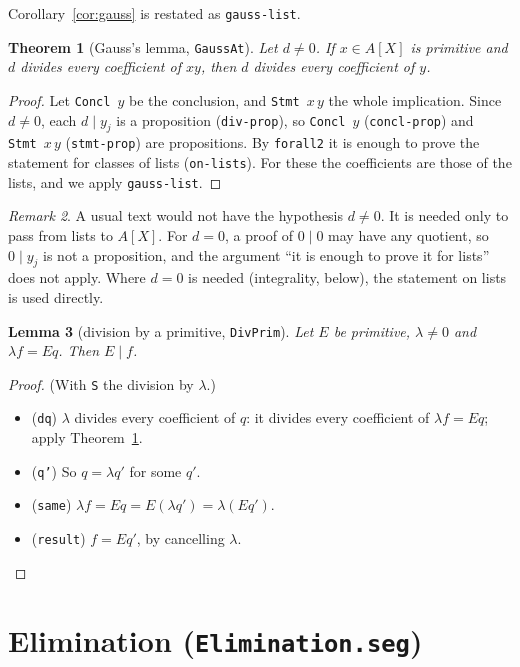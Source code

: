 \documentclass[11pt]{amsart}
\newtheorem{theorem}{Theorem}[section]
\newtheorem{lemma}[theorem]{Lemma}
\theoremstyle{definition}
\theoremstyle{remark}
\newtheorem{remark}[theorem]{Remark}
\newcommand{\nm}[1]{\textup{\texttt{#1}}}
\newcommand{\file}[1]{\textup{\texttt{#1.seg}}}
\begin{document}
Corollary~\ref{cor:gauss} is restated as \nm{gauss-list}.

\begin{theorem}[Gauss's lemma, \nm{GaussAt}]\label{thm:gauss}
Let $d\neq0$. If $x\in A[X]$ is primitive and $d$ divides every
coefficient of $xy$, then $d$ divides every coefficient of $y$.
\end{theorem}
\begin{proof}
Let \nm{Concl}~$y$ be the conclusion, and \nm{Stmt}~$x\,y$ the whole
implication. Since $d\neq0$, each $d\mid y_j$ is a proposition
(\nm{div-prop}), so \nm{Concl}~$y$ (\nm{concl-prop}) and \nm{Stmt}~$x\,y$
(\nm{stmt-prop}) are propositions. By \nm{forall2} it is enough to prove
the statement for classes of lists (\nm{on-lists}). For these the
coefficients are those of the lists, and we apply \nm{gauss-list}.
\end{proof}

\begin{remark}
A usual text would not have the hypothesis $d\neq0$. It is needed only to
pass from lists to $A[X]$. For $d=0$, a proof of $0\mid0$ may have any
quotient, so $0\mid y_j$ is not a proposition, and the argument ``it is
enough to prove it for lists'' does not apply. Where $d=0$ is needed
(integrality, below), the statement on lists is used directly.
\end{remark}

\begin{lemma}[division by a primitive, \nm{DivPrim}]\label{lem:divprim}
Let $E$ be primitive, $\lambda\neq0$ and $\lambda f = Eq$. Then $E\mid f$.
\end{lemma}
\begin{proof}
(With \nm{S} the division by $\lambda$.)
\begin{itemize}
\item (\nm{dq}) $\lambda$ divides every coefficient of $q$: it divides
  every coefficient of $\lambda f = Eq$; apply Theorem~\ref{thm:gauss}.
\item (\nm{q'}) So $q = \lambda q'$ for some $q'$.
\item (\nm{same}) $\lambda f = Eq = E(\lambda q') = \lambda(Eq')$.
\item (\nm{result}) $f = Eq'$, by cancelling $\lambda$.\qedhere
\end{itemize}
\end{proof}

\section{Elimination (\file{Elimination})}\label{sec:elim}
\end{document}

